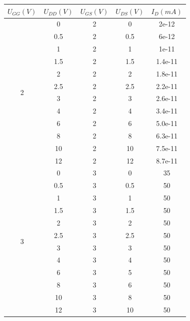 \documentclass[10pt, a4paper]{article} %
\begin{document}
\begin{table}[ht]
    \centering
    \label{tab:b}
    \begin{tabular}{|c|c|c|c|c|}
        \hline
        $U_{GG}(V)$&$U_{DD}(V)$&$U_{GS}(V)$&$U_{DS}(V)$&$I_{D}(mA)$\\ \hline
        \multirow{12}{*}{2} &0  &2 &0  &2e-12  \\ \cline{2-5}
                            &0.5&2 &0.5&6e-12  \\ \cline{2-5}
                            &1  &2 &1  &1e-11  \\ \cline{2-5}
                            &1.5&2 &1.5&1.4e-11\\ \cline{2-5}
                            &2  &2 &2  &1.8e-11\\ \cline{2-5}
                            &2.5&2 &2.5&2.2e-11\\ \cline{2-5}
                            &3  &2 &3  &2.6e-11\\ \cline{2-5}
                            &4  &2 &4  &3.4e-11\\ \cline{2-5}
                            &6  &2 &6  &5.0e-11\\ \cline{2-5}
                            &8  &2 &8  &6.3e-11\\ \cline{2-5}
                            &10 &2 &10 &7.5e-11\\ \cline{2-5}
                            &12 &2 &12 &8.7e-11\\ \hline
        \multirow{12}{*}{3} &0  &3 &0  &35 \\ \cline{2-5} 
                            &0.5&3 &0.5&50 \\ \cline{2-5}
                            &1  &3 &1  &50 \\ \cline{2-5}
                            &1.5&3 &1.5&50 \\ \cline{2-5}
                            &2  &3 &2  &50 \\ \cline{2-5}
                            &2.5&3 &2.5&50 \\ \cline{2-5}
                            &3  &3 &3  &50 \\ \cline{2-5}
                            &4  &3 &4  &50 \\ \cline{2-5}
                            &6  &3 &5  &50 \\ \cline{2-5}
                            &8  &3 &6  &50 \\ \cline{2-5}
                            &10 &3 &8  &50 \\ \cline{2-5}
                            &12 &3 &10 &50 \\ \hline
    \end{tabular}
\end{table}
\end{document}
